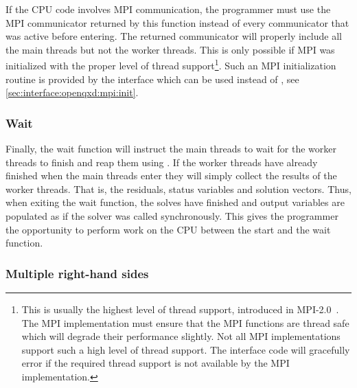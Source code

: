 If the CPU code involves MPI communication, the programmer must use the MPI communicator returned by this function instead of every communicator that was active before entering.
The returned communicator will properly include all the main threads but not the worker threads.
This is only possible if MPI was initialized with the proper level of thread support\footnote{This is usually the highest level of thread support,  introduced in MPI-2.0~\cite{standard:mpi-2.0}. The MPI implementation must ensure that the MPI functions are thread safe which will degrade their performance slightly. Not all MPI implementations support such a high level of thread support. The interface code will gracefully error if the required thread support is not available by the MPI implementation.}.
Such an MPI initialization routine is provided by the interface  which can be used instead of , see \cref{sec:interface:openqxd:mpi:init}.

\subsubsection{Wait}
\label{sec:interface:solver:async:wait}

Finally, the wait function  will instruct the main threads to wait for the worker threads to finish and reap them using .
If the worker threads have already finished when the main threads enter they will simply collect the results of the worker threads.
That is, the residuals, status variables and solution vectors.
Thus, when exiting the wait function, the solves have finished and output variables are populated as if the solver was called synchronously.
This gives the programmer the opportunity to perform work on the CPU between the start and the wait function.

\subsubsection{Multiple right-hand sides}

